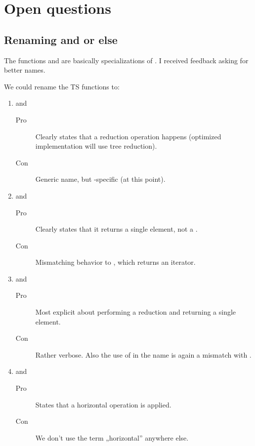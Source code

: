 \section{Open questions}

\subsection{Renaming  and  or else}\label{sec:hminhmax}
The functions  and  are basically
specializations of .
I received feedback asking for better names.

We could rename the TS functions to:
\begin{enumerate}
  \item {} and
    \begin{description}
      \item[Pro] Clearly states that a reduction operation happens (optimized
        implementation will use tree reduction).
      \item[Con] Generic name, but \simd-specific (at this point).
    \end{description}

  \item {} and
    \begin{description}
      \item[Pro] Clearly states that it returns a single element, not a \simd.
      \item[Con] Mismatching behavior to \stdranges{}, which
        returns an iterator.
    \end{description}

  \item {} and
    \begin{description}
      \item[Pro] Most explicit about performing a reduction and returning a
        single element.
      \item[Con] Rather verbose. Also the use of  in the name
        is again a mismatch with \stdranges{}.
    \end{description}

  \item {} and
    \begin{description}
      \item[Pro] States that a horizontal operation is applied.
      \item[Con] We don't use the term „horizontal'' anywhere else.
    \end{description}


\end{enumerate}
